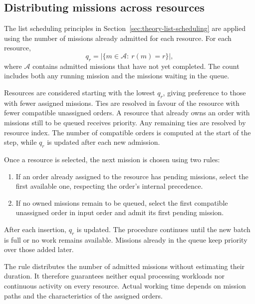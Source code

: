 \subsection{Distributing missions across resources}

The list scheduling principles in Section~\ref{sec:theory-list-scheduling} are
applied using the number of missions already admitted for each resource.
For each resource,
\begin{equation}
    q_r=|\{m\in\mathcal A:\ r(m)=r\}|,
\end{equation}
where $\mathcal A$ contains admitted missions that have not yet completed.
The count includes both any running mission and the missions waiting in the
queue.

Resources are considered starting with the lowest $q_r$, giving preference to
those with fewer assigned missions. Ties are resolved in favour of the resource
with fewer compatible unassigned orders. A resource that already owns an order
with missions still to be queued receives priority. Any remaining ties are
resolved by resource index. The number of compatible orders is computed at the
start of the step, while $q_r$ is updated after each new admission.

Once a resource is selected, the next mission is chosen using two rules:
\begin{enumerate}
    \item If an order already assigned to the resource has pending missions,
    select the first available one, respecting the order's internal precedence.
    \item If no owned missions remain to be queued, select the first compatible
    unassigned order in input order and admit its first pending mission.
\end{enumerate}
After each insertion, $q_r$ is updated. The procedure continues until the new
batch is full or no work remains available. Missions already in the queue keep
priority over those added later.

The rule distributes the number of admitted missions without estimating their
duration. It therefore guarantees neither equal processing workloads nor
continuous activity on every resource. Actual working time depends on mission
paths and the characteristics of the assigned orders.


